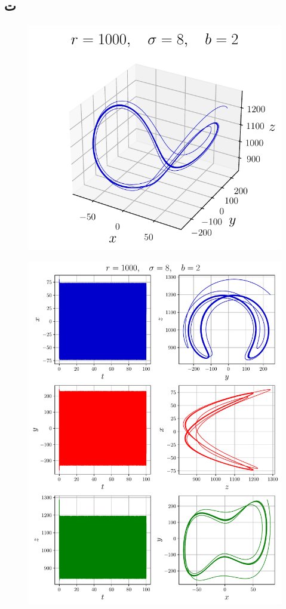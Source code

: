 \documentclass[12pt,a4paper]{article}
\begin{document}
	\subsection{ت}
	\begin{figure}[h!]
		\centering
		\includegraphics[width=\linewidth]{fig/lorenz5-3d}
	\end{figure}
	\begin{figure}
		\centering
		\includegraphics{fig/lorenz5}
	\end{figure}
	\restoregeometry
\end{document}
